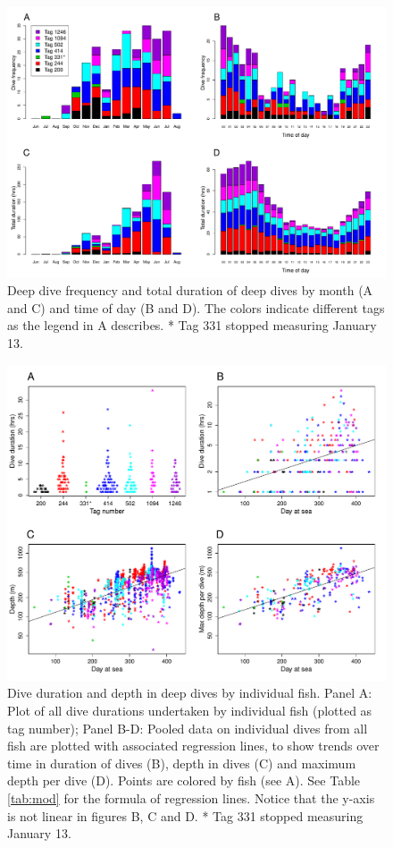 \begin{figure}[ht]
  \centering
  \includegraphics[width=\linewidth]{fig2.pdf}
  \caption{Deep dive frequency and total duration of deep dives by month (A and C) and time of day (B and D). The colors indicate different tags as the legend in A describes. * Tag 331 stopped measuring January 13.}
  \label{fig:freq}
\end{figure}

\begin{figure}[ht]
  \centering
  \includegraphics[width=\linewidth]{fig3.pdf}
  \caption{Dive duration and depth in deep dives by individual fish.
Panel A: Plot of all dive durations undertaken by individual fish (plotted as tag number); 
Panel B-D: Pooled data on individual dives from all fish are plotted with associated regression lines, to show trends over time in duration of dives (B), depth in dives (C) and maximum depth per dive (D).
Points are colored by fish (see A). 
See Table \ref{tab:mod} for the formula of regression lines. 
Notice that the y-axis is not linear in figures B, C and D. 
* Tag 331 stopped measuring January 13.}
  \label{fig:lendep}
\end{figure}


